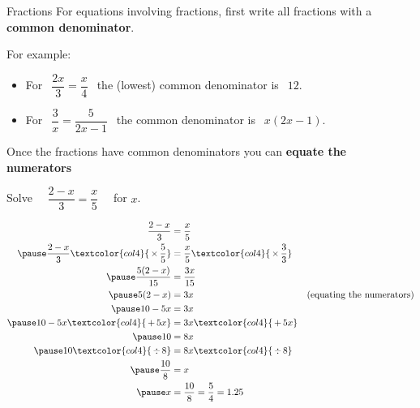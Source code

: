 \documentclass[aspectratio=169,10pt]{beamer}
\begin{document}
\begin{frame}{Fractions}
  For equations involving fractions, first write all fractions with a \textbf{common denominator}.\pause
  
  For example:
    \begin{itemize}
      \item For $\ \ \dfrac{2x}{3}=\dfrac{x}{4}\ \ $ the (lowest) common denominator is \pause $\ \ 12$.\pause
      \item For $\ \ \dfrac{3}{x}=\dfrac{5}{2x-1}\ \ $ the  common denominator is \pause $\ \ x(2x-1)$.
    \end{itemize}
  Once the fractions have common denominators you can \textbf{equate the numerators}
\end{frame}

\begin{frame}
\small
  \begin{example}
    Solve $\quad\dfrac{2-x}{3}=\dfrac{x}{5}\quad$ for $x$.
  \end{example}
  \begin{solution}[]\vspace{-2em}
    \[
      \begin{aligned}
         \frac{2-x}{3}&=\frac{x}{5}\\\pause
         \frac{2-x}{3}\textcolor{col4}{\,\times\,\frac{5}{5}}&=\frac{x}{5}\textcolor{col4}{\,\times\,\frac{3}{3}}\\\pause
         \frac{5(2-x)}{15}&=\frac{3x}{15}\\\pause
         5(2-x)&=3x&\text{(equating the numerators)}\\\pause
         10-5x&=3x\\\pause
         10-5x\textcolor{col4}{\,+\,5x}&=3x\textcolor{col4}{\,+\,5x}\\\pause
         10&=8x\\\pause
         10\textcolor{col4}{\,\div\,8}&=8x\textcolor{col4}{\,\div\,8}\\\pause
         \frac{10}{8}&=x\\\pause
         x&=\frac{10}{8}=\frac{5}{4}=1.25
      \end{aligned}
      \]
  \end{solution}
\end{frame}
\end{document}
